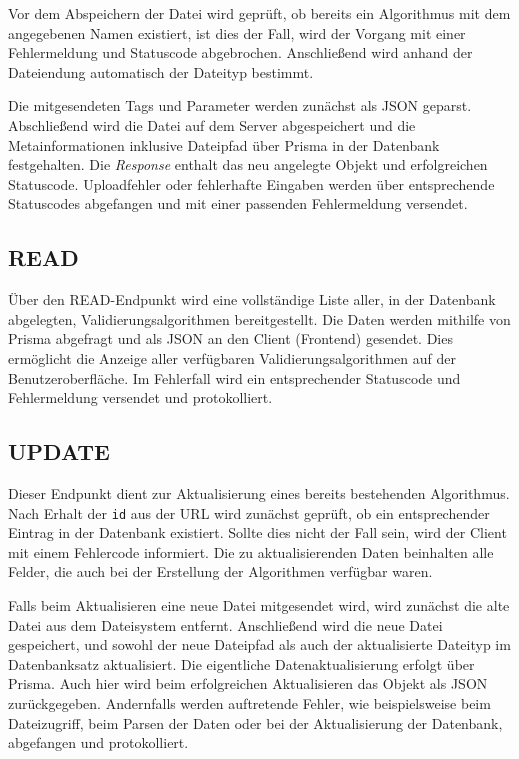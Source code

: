 Vor dem Abspeichern der Datei wird geprüft, ob bereits ein Algorithmus mit dem angegebenen Namen existiert, ist dies der Fall, wird der Vorgang mit einer Fehlermeldung und Statuscode abgebrochen. Anschließend wird anhand der Dateiendung automatisch der Dateityp bestimmt.

Die mitgesendeten Tags und Parameter werden zunächst als JSON geparst. Abschließend wird die Datei auf dem Server abgespeichert und die Metainformationen inklusive Dateipfad über Prisma in der Datenbank festgehalten. Die \textit{Response} enthalt das neu angelegte Objekt und erfolgreichen Statuscode. Uploadfehler oder fehlerhafte Eingaben werden über entsprechende Statuscodes abgefangen und mit einer passenden Fehlermeldung versendet.

\subsection{READ}


Über den READ-Endpunkt wird eine vollständige Liste aller, in der Datenbank abgelegten, Validierungsalgorithmen bereitgestellt. Die Daten werden mithilfe von Prisma abgefragt und als JSON an den Client (Frontend) gesendet. Dies ermöglicht die Anzeige aller verfügbaren Validierungsalgorithmen auf der Benutzeroberfläche. Im Fehlerfall wird ein entsprechender Statuscode und Fehlermeldung versendet und protokolliert.

\subsection{UPDATE}


Dieser Endpunkt dient zur Aktualisierung eines bereits bestehenden Algorithmus. Nach Erhalt der \texttt{id} aus der URL wird zunächst geprüft, ob ein entsprechender Eintrag in der Datenbank existiert. Sollte dies nicht der Fall sein, wird der Client mit einem Fehlercode informiert. Die zu aktualisierenden Daten beinhalten alle Felder, die auch bei der Erstellung der Algorithmen verfügbar waren.

Falls beim Aktualisieren eine neue Datei mitgesendet wird, wird zunächst die alte Datei aus dem Dateisystem entfernt. Anschließend wird die neue Datei gespeichert, und sowohl der neue Dateipfad als auch der aktualisierte Dateityp im Datenbanksatz aktualisiert. Die eigentliche Datenaktualisierung erfolgt über Prisma. Auch hier wird beim erfolgreichen Aktualisieren das Objekt als JSON zurückgegeben. Andernfalls werden auftretende Fehler, wie beispielsweise beim Dateizugriff, beim Parsen der Daten oder bei der Aktualisierung der Datenbank, abgefangen und protokolliert.

